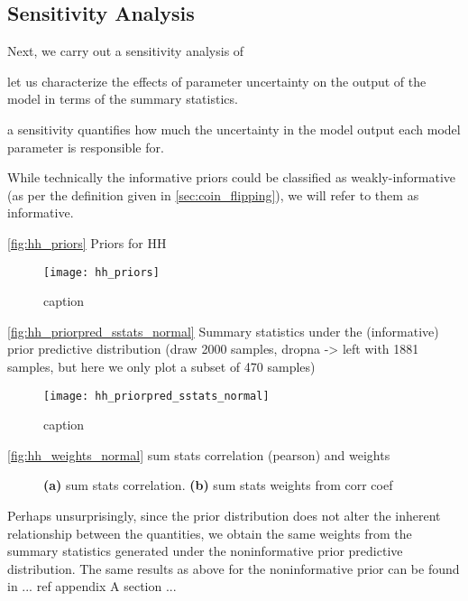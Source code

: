 \subsection{Sensitivity Analysis}

Next, we carry out a sensitivity analysis of 

let us characterize the effects of parameter uncertainty on the output of the model in terms of the summary statistics.  

a sensitivity quantifies how much the uncertainty in the model output each model parameter is responsible for. 

While technically the informative priors could be classified as weakly-informative (as per the definition given in \cref{sec:coin_flipping}), we will refer to them as informative. 

\autoref{fig:hh_priors} Priors for HH

\begin{figure}[H]
    \centering
    \texttt{[image: hh\_priors]}
    \caption{caption}
    \label{fig:hh_priors}
\end{figure} 


\autoref{fig:hh_priorpred_sstats_normal} Summary statistics under the (informative) prior predictive distribution (draw 2000 samples, dropna -> left with 1881 samples, but here we only plot a subset of 470 samples)

\begin{figure}[H]
    \centering
    \texttt{[image: hh\_priorpred\_sstats\_normal]}
    \caption{caption}
    \label{fig:hh_priorpred_sstats_normal}
\end{figure} 


\autoref{fig:hh_weights_normal} sum stats correlation (pearson) and weights

\begin{figure}[H]
\centering
{}
\qquad
{}
\caption{\textbf{(a)} sum stats correlation. \textbf{(b)} sum stats weights from corr coef
}
\label{fig:hh_weights_normal}
\end{figure}


Perhaps unsurprisingly, since the prior distribution does not alter the inherent relationship between the quantities, we obtain the same weights from the summary statistics generated under the noninformative prior predictive distribution. The same results as above for the noninformative prior can be found in ... ref appendix A section ...




